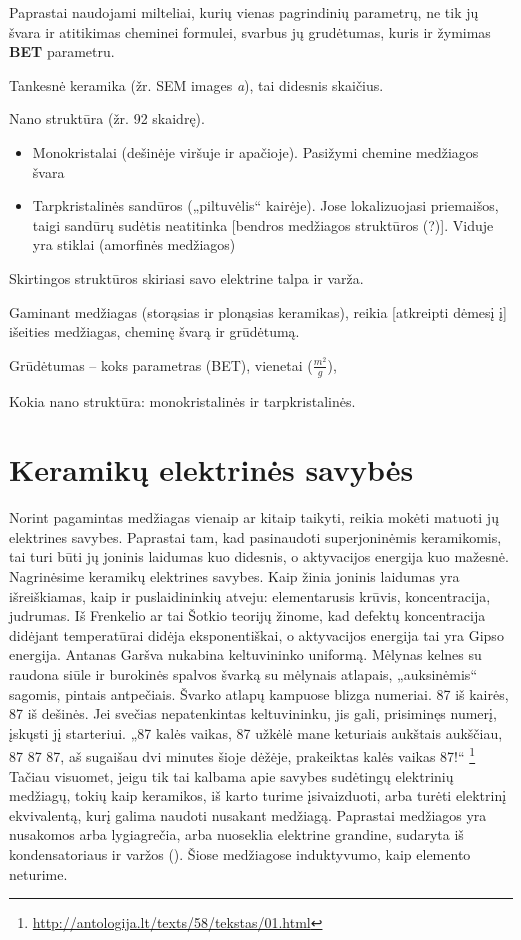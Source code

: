 Paprastai naudojami milteliai, kurių vienas pagrindinių parametrų,
ne tik jų švara ir atitikimas cheminei formulei,
svarbus jų grudėtumas, kuris ir žymimas \textbf{BET} parametru.

Tankesnė keramika (žr. SEM images \textit{a}), tai didesnis skaičius.

Nano struktūra (žr. 92 skaidrę).
\begin{itemize}
  \item Monokristalai (dešinėje viršuje ir apačioje). Pasižymi chemine
    medžiagos švara
  \item Tarpkristalinės sandūros („piltuvėlis“ kairėje).
    Jose lokalizuojasi priemaišos, taigi sandūrų sudėtis neatitinka
    [bendros medžiagos struktūros (?)]. Viduje yra stiklai (amorfinės
    medžiagos)
\end{itemize}
Skirtingos struktūros skiriasi savo elektrine talpa ir varža.

\begin{remember}
  \item Gaminant medžiagas (storąsias ir plonąsias keramikas), reikia
    [atkreipti dėmesį į] išeities medžiagas, cheminę švarą ir grūdėtumą.
  \item Grūdėtumas – koks parametras (BET), vienetai ($\frac{m^2}{g}$),
  \item Kokia nano struktūra: monokristalinės ir tarpkristalinės.
\end{remember}

\section{Keramikų elektrinės savybės}


Norint pagamintas medžiagas vienaip ar kitaip taikyti, reikia mokėti
matuoti jų elektrines savybes. Paprastai tam, kad pasinaudoti
superjoninėmis keramikomis, tai turi būti jų joninis laidumas
kuo didesnis, o aktyvacijos energija kuo mažesnė. Nagrinėsime keramikų
elektrines savybes. Kaip žinia joninis laidumas yra išreiškiamas,
kaip ir puslaidininkių atveju: elementarusis krūvis, koncentracija,
judrumas. Iš Frenkelio ar tai Šotkio teorijų žinome, kad defektų
koncentracija didėjant temperatūrai didėja eksponentiškai, o aktyvacijos
energija tai yra Gipso energija.
  {Antanas Garšva nukabina keltuvininko uniformą. Mėlynas kelnes su
  raudona siūle ir burokinės spalvos švarką su mėlynais atlapais,
  „auksinėmis“ sagomis, pintais antpečiais. Švarko atlapų kampuose
  blizga numeriai. 87 iš kairės, 87 iš dešinės. Jei svečias
  nepatenkintas keltuvininku, jis gali, prisiminęs numerį, įskųsti jį
  starteriui. „87 kalės vaikas, 87 užkėlė mane keturiais aukštais
  aukščiau, 87 87 87, aš sugaišau dvi minutes šioje dėžėje,
  prakeiktas kalės vaikas 87!“}%
\footnote{\url{http://antologija.lt/texts/58/tekstas/01.html}}
Tačiau visuomet, jeigu tik tai kalbama apie savybes sudėtingų
elektrinių medžiagų, tokių kaip keramikos, iš karto turime
įsivaizduoti, arba turėti elektrinį ekvivalentą, kurį galima
naudoti nusakant medžiagą. Paprastai medžiagos yra nusakomos arba
lygiagrečia, arba nuoseklia elektrine grandine, sudaryta iš
kondensatoriaus ir varžos (). Šiose medžiagose induktyvumo,
kaip elemento neturime.

